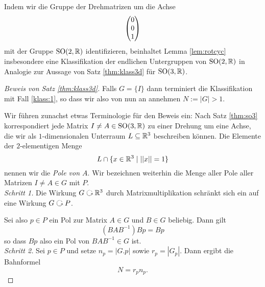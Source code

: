 \documentclass{book}
\begin{document}
\begin{rem}
    \label{rem:klass2d}
    Indem wir die Gruppe der Drehmatrizen um die Achse
    \[
        \begin{pmatrix}  0 \\ 0 \\ 1  \end{pmatrix}
    \]
    mit der Gruppe $\operatorname{SO}(2, \mathbb{R})$ identifizieren, beinhaltet Lemma \ref{lem:rotcyc}
    insbesondere eine Klassifikation der endlichen Untergruppen von
    $\operatorname{SO}(2,\mathbb{R})$ in Analogie zur Aussage von Satz \ref{thm:klass3d} für
    $\operatorname{SO}(3,\mathbb{R})$.
\end{rem}

\begin{proof}[Beweis von Satz \ref{thm:klass3d}]
    Falls $G = \{I\}$ dann terminiert die Klassifikation mit Fall
    \ref{klass:1}, so dass wir also von nun an annehmen $N := |G| > 1$.

    Wir führen zunachst etwas Terminologie für den Beweis ein: Nach Satz
    \ref{thm:so3} korrespondiert jede Matrix $I \neq A \in \operatorname{SO}(3,\mathbb{R})$ zu einer
    Drehung um eine Achse, die wir als $1$-dimensionalen Unterraum $L \subseteq
    \mathbb{R}^3$ beschreiben können. Die Elemente der $2$-elementigen Menge 
    \[
        L \cap \{ x \in \mathbb{R}^3 \; | \; ||x|| = 1\}
    \]
    nennen wir die {\em Pole von $A$}. Wir bezeichnen weiterhin die Menge aller
    Pole aller Matrizen $I \neq A \in G$ mit $P$.\\

    \noindent
    \emph{Schritt 1.} Die Wirkung $G \actson \RR^3$ durch Matrixmultiplikation
    schränkt sich ein auf eine Wirkung $G \actson P$. 

    Sei also $p \in P$ ein Pol zur Matrix $A \in G$ und $B \in G$ beliebig. Dann gilt
    \[
        (BAB^{-1})Bp = Bp
    \]
    so dass $Bp$ also ein Pol von $BAB^{-1} \in G$ ist.\\

    \noindent
    \emph{Schritt 2.} Sei $p \in P$ und setze $n_p = |G.p|$ sowie $r_p = |G_p|$.
    Dann ergibt die Bahnformel
    \begin{equation}
        \label{eq:bahnso3}
        N = r_p  n_p.
    \end{equation}


\end{proof}
\end{document}

